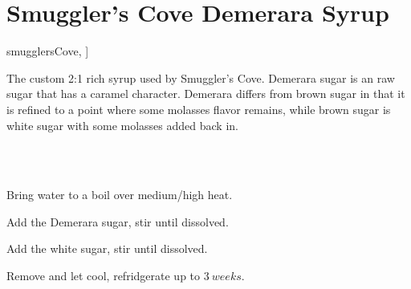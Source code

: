 \section[SC Demerara Syrup]{Smuggler's Cove Demerara Syrup}


\begin{recipestats}[
	servings=$1~C$,
	preptime=5~\minute,
	original=\citeauthor{smugglersCove}~\cite[p.~324]{smugglersCove},
]
\end{recipestats}

\begin{recipeabstract}
	The custom 2:1 rich syrup used by Smuggler's Cove.
	Demerara sugar is an raw sugar that has a caramel character.
	Demerara differs from brown sugar in that it is refined to a point where some molasses flavor remains,
		while brown sugar is white sugar with some molasses added back in.
\end{recipeabstract}


\begin{ingredientcolumns}[1]
	\begin{ingredientblock}
		\\
		\\
	\end{ingredientblock}
\end{ingredientcolumns}


\begin{preparation}
\item Bring water to a boil over medium/high heat.
\item Add the Demerara sugar, stir until dissolved.
\item Add the white sugar, stir until dissolved.
\item Remove and let cool, refridgerate up to $3~weeks$.
\end{preparation}


\recipeend
